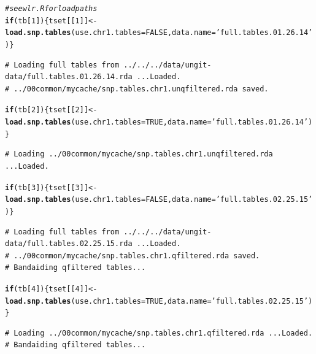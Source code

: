 \documentclass{article}\usepackage[]{graphicx}\usepackage[]{color}
\makeatletter
\newcommand{\hlnum}[1]{\textcolor[rgb]{0.686,0.059,0.569}{#1}}%
\newcommand{\hlstr}[1]{\textcolor[rgb]{0.192,0.494,0.8}{#1}}%
\newcommand{\hlcom}[1]{\textcolor[rgb]{0.678,0.584,0.686}{\textit{#1}}}%
\newcommand{\hlstd}[1]{\textcolor[rgb]{0.345,0.345,0.345}{#1}}%
\newcommand{\hlkwa}[1]{\textcolor[rgb]{0.161,0.373,0.58}{\textbf{#1}}}%
\newcommand{\hlkwb}[1]{\textcolor[rgb]{0.69,0.353,0.396}{#1}}%
\newcommand{\hlkwc}[1]{\textcolor[rgb]{0.333,0.667,0.333}{#1}}%
\newcommand{\hlkwd}[1]{\textcolor[rgb]{0.737,0.353,0.396}{\textbf{#1}}}%
\newenvironment{kframe}{%
 \def\at@end@of@kframe{}%
 \ifinner\ifhmode%
  \def\at@end@of@kframe{\end{minipage}}%
  \begin{minipage}{\columnwidth}%
 \fi\fi%
 \def\FrameCommand##1{\hskip\@totalleftmargin \hskip-\fboxsep
 \colorbox{shadecolor}{##1}\hskip-\fboxsep
     \hskip-\linewidth \hskip-\@totalleftmargin \hskip\columnwidth}%
 \MakeFramed {\advance\hsize-\width
   \@totalleftmargin\z@ \linewidth\hsize
   \@setminipage}}%
 {\par\unskip\endMakeFramed%
 \at@end@of@kframe}
\newenvironment{knitrout}{}{} %
\makeatother
\begin{document}
\begin{knitrout}\footnotesize
{}\color{fgcolor}\begin{kframe}
\begin{alltt}
\hlcom{# see wlr.R for load paths}
\hlkwa{if}\hlstd{(tb[}\hlnum{1}\hlstd{])\{tset[[}\hlnum{1}\hlstd{]]} \hlkwb{<-} \hlkwd{load.snp.tables}\hlstd{(}\hlkwc{use.chr1.tables} \hlstd{=} \hlnum{FALSE}\hlstd{,} \hlkwc{data.name}\hlstd{=}\hlstr{'full.tables.01.26.14'}\hlstd{)\}}
\end{alltt}
\begin{verbatim}
# Loading full tables from ../../../data/ungit-data/full.tables.01.26.14.rda ...Loaded.
# ../00common/mycache/snp.tables.chr1.unqfiltered.rda saved.
\end{verbatim}
\begin{alltt}
\hlkwa{if}\hlstd{(tb[}\hlnum{2}\hlstd{])\{tset[[}\hlnum{2}\hlstd{]]} \hlkwb{<-} \hlkwd{load.snp.tables}\hlstd{(}\hlkwc{use.chr1.tables} \hlstd{=} \hlnum{TRUE} \hlstd{,} \hlkwc{data.name}\hlstd{=}\hlstr{'full.tables.01.26.14'}\hlstd{)\}}
\end{alltt}
\begin{verbatim}
# Loading ../00common/mycache/snp.tables.chr1.unqfiltered.rda ...Loaded.
\end{verbatim}
\begin{alltt}
\hlkwa{if}\hlstd{(tb[}\hlnum{3}\hlstd{])\{tset[[}\hlnum{3}\hlstd{]]} \hlkwb{<-} \hlkwd{load.snp.tables}\hlstd{(}\hlkwc{use.chr1.tables} \hlstd{=} \hlnum{FALSE}\hlstd{,} \hlkwc{data.name}\hlstd{=}\hlstr{'full.tables.02.25.15'}\hlstd{)\}}
\end{alltt}
\begin{verbatim}
# Loading full tables from ../../../data/ungit-data/full.tables.02.25.15.rda ...Loaded.
# ../00common/mycache/snp.tables.chr1.qfiltered.rda saved.
# Bandaiding qfiltered tables...
\end{verbatim}
\begin{alltt}
\hlkwa{if}\hlstd{(tb[}\hlnum{4}\hlstd{])\{tset[[}\hlnum{4}\hlstd{]]} \hlkwb{<-} \hlkwd{load.snp.tables}\hlstd{(}\hlkwc{use.chr1.tables} \hlstd{=} \hlnum{TRUE} \hlstd{,} \hlkwc{data.name}\hlstd{=}\hlstr{'full.tables.02.25.15'}\hlstd{)\}}
\end{alltt}
\begin{verbatim}
# Loading ../00common/mycache/snp.tables.chr1.qfiltered.rda ...Loaded.
# Bandaiding qfiltered tables...
\end{verbatim}
\end{kframe}
\end{knitrout}
\end{document}
